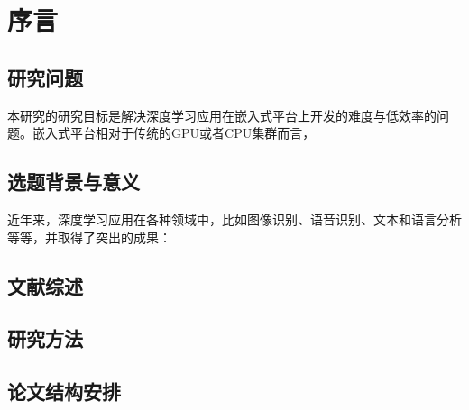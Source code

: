 
\chapter{序言}

\section{研究问题}
本研究的研究目标是解决深度学习应用在嵌入式平台上开发的难度与低效率的问题。嵌入式平台相对于传统的GPU或者CPU集群而言，

\section{选题背景与意义}
近年来，深度学习应用在各种领域中，比如图像识别、语音识别、文本和语言分析等等，并取得了突出的成果：

\section{文献综述}

\section{研究方法}

\section{论文结构安排}

